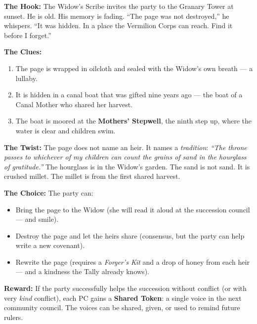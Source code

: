 \begin{tcolorbox}[colback=blue!5!white,colframe=blue!60!black,title={Adventure Seed: The Ninth Page},breakable]

\textbf{The Hook:} The Widow's Scribe invites the party to the Granary Tower at sunset. He is old. His memory is fading. ``The page was not destroyed,'' he whispers. ``It was hidden. In a place the Vermilion Corps can reach. Find it before I forget.''

\vspace{2mm}
\textbf{The Clues:}
\begin{enumerate}
\item The page is wrapped in oilcloth and sealed with the Widow's own breath --- a lullaby.
\item It is hidden in a canal boat that was gifted nine years ago --- the boat of a Canal Mother who shared her harvest.
\item The boat is moored at the \textbf{Mothers' Stepwell}, the ninth step up, where the water is clear and children swim.
\end{enumerate}

\vspace{2mm}
\textbf{The Twist:} The page does not name an heir. It names a \textit{tradition}: \textit{``The throne passes to whichever of my children can count the grains of sand in the hourglass of gratitude.''} The hourglass is in the Widow's garden. The sand is not sand. It is crushed millet. The millet is from the first shared harvest.

\vspace{2mm}
\textbf{The Choice:} The party can:
\begin{itemize}
\item Bring the page to the Widow (she will read it aloud at the succession council --- and smile).
\item Destroy the page and let the heirs share (consensus, but the party can help write a new covenant).
\item Rewrite the page (requires a \textit{Forger's Kit} and a drop of honey from each heir --- and a kindness the Tally already knows).
\end{itemize}

\vspace{2mm}
\textbf{Reward:} If the party successfully helps the succession without conflict (or with very \textit{kind} conflict), each PC gains a \textbf{Shared Token}: a single voice in the next community council. The voices can be shared, given, or used to remind future rulers.
\end{tcolorbox}

